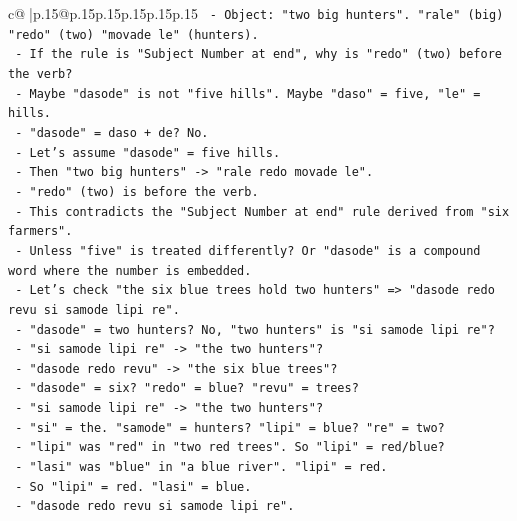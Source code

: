 \documentclass{article}
\begin{document}
{\begin{supertabular}{c@{$\;$}|p{.15\linewidth}@{}p{.15\linewidth}p{.15\linewidth}p{.15\linewidth}p{.15\linewidth}p{.15\linewidth}}
{{{\texttt{                  {-} Object: "two big hunters". "rale" (big) "redo" (two) "movade le" (hunters).} \\
\texttt{                  {-} If the rule is "Subject Number at end", why is "redo" (two) before the verb?} \\
\texttt{                  {-} Maybe "dasode" is not "five hills". Maybe "daso" = five, "le" = hills.} \\
\texttt{                  {-} "dasode" = daso + de? No.} \\
\texttt{                  {-} Let's assume "dasode" = five hills.} \\
\texttt{                  {-} Then "two big hunters" {-}> "rale redo movade le".} \\
\texttt{                  {-} "redo" (two) is before the verb.} \\
\texttt{                  {-} This contradicts the "Subject Number at end" rule derived from "six farmers".} \\
\texttt{                  {-} Unless "five" is treated differently? Or "dasode" is a compound word where the number is embedded.} \\
\texttt{                  {-} Let's check "the six blue trees hold two hunters" => "dasode redo revu si samode lipi re".} \\
\texttt{                    {-} "dasode" = two hunters? No, "two hunters" is "si samode lipi re"?} \\
\texttt{                    {-} "si samode lipi re" {-}> "the two hunters"?} \\
\texttt{                    {-} "dasode redo revu" {-}> "the six blue trees"?} \\
\texttt{                    {-} "dasode" = six? "redo" = blue? "revu" = trees?} \\
\texttt{                    {-} "si samode lipi re" {-}> "the two hunters"?} \\
\texttt{                    {-} "si" = the. "samode" = hunters? "lipi" = blue? "re" = two?} \\
\texttt{                    {-} "lipi" was "red" in "two red trees". So "lipi" = red/blue?} \\
\texttt{                    {-} "lasi" was "blue" in "a blue river". "lipi" = red.} \\
\texttt{                    {-} So "lipi" = red. "lasi" = blue.} \\
\texttt{                    {-} "dasode redo revu si samode lipi re".} \\
}}}
\end{supertabular}}
\end{document}
